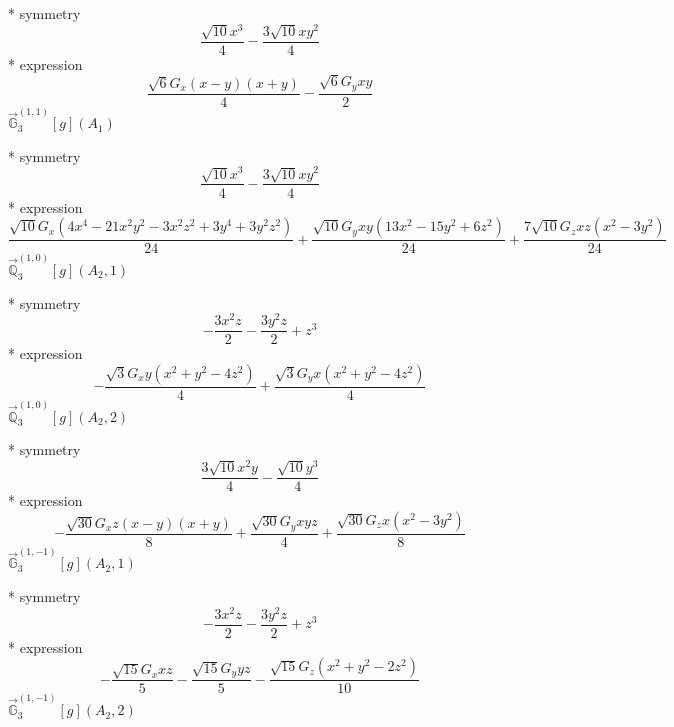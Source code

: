 \documentclass[fleqn,8pt]{jsarticle}
\begin{document}
\noindent\quad ** symmetry
\begin{dmath*}
\frac{\sqrt{10} x^{3}}{4} - \frac{3 \sqrt{10} x y^{2}}{4}
\end{dmath*}
\noindent\quad ** expression
\begin{dmath*}
\frac{\sqrt{6} G_{x} \left(x - y\right) \left(x + y\right)}{4} - \frac{\sqrt{6} G_{y} x y}{2}
\end{dmath*}
\noindent\quad $\vec{\mathbb{G}}_{3}^{(1,1)}[g](A_{1})$

\noindent\quad ** symmetry
\begin{dmath*}
\frac{\sqrt{10} x^{3}}{4} - \frac{3 \sqrt{10} x y^{2}}{4}
\end{dmath*}
\noindent\quad ** expression
\begin{dmath*}
\frac{\sqrt{10} G_{x} \left(4 x^{4} - 21 x^{2} y^{2} - 3 x^{2} z^{2} + 3 y^{4} + 3 y^{2} z^{2}\right)}{24} + \frac{\sqrt{10} G_{y} x y \left(13 x^{2} - 15 y^{2} + 6 z^{2}\right)}{24} + \frac{7 \sqrt{10} G_{z} x z \left(x^{2} - 3 y^{2}\right)}{24}
\end{dmath*}
\noindent\quad $\vec{\mathbb{Q}}_{3}^{(1,0)}[g](A_{2},1)$

\noindent\quad ** symmetry
\begin{dmath*}
- \frac{3 x^{2} z}{2} - \frac{3 y^{2} z}{2} + z^{3}
\end{dmath*}
\noindent\quad ** expression
\begin{dmath*}
- \frac{\sqrt{3} G_{x} y \left(x^{2} + y^{2} - 4 z^{2}\right)}{4} + \frac{\sqrt{3} G_{y} x \left(x^{2} + y^{2} - 4 z^{2}\right)}{4}
\end{dmath*}
\noindent\quad $\vec{\mathbb{Q}}_{3}^{(1,0)}[g](A_{2},2)$

\noindent\quad ** symmetry
\begin{dmath*}
\frac{3 \sqrt{10} x^{2} y}{4} - \frac{\sqrt{10} y^{3}}{4}
\end{dmath*}
\noindent\quad ** expression
\begin{dmath*}
- \frac{\sqrt{30} G_{x} z \left(x - y\right) \left(x + y\right)}{8} + \frac{\sqrt{30} G_{y} x y z}{4} + \frac{\sqrt{30} G_{z} x \left(x^{2} - 3 y^{2}\right)}{8}
\end{dmath*}
\noindent\quad $\vec{\mathbb{G}}_{3}^{(1,-1)}[g](A_{2},1)$

\noindent\quad ** symmetry
\begin{dmath*}
- \frac{3 x^{2} z}{2} - \frac{3 y^{2} z}{2} + z^{3}
\end{dmath*}
\noindent\quad ** expression
\begin{dmath*}
- \frac{\sqrt{15} G_{x} x z}{5} - \frac{\sqrt{15} G_{y} y z}{5} - \frac{\sqrt{15} G_{z} \left(x^{2} + y^{2} - 2 z^{2}\right)}{10}
\end{dmath*}
\noindent\quad $\vec{\mathbb{G}}_{3}^{(1,-1)}[g](A_{2},2)$
\end{document}
